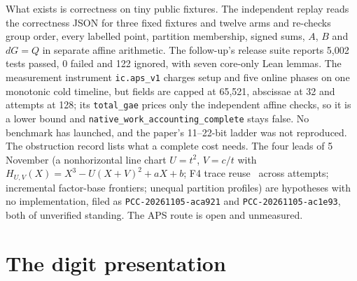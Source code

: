 What exists is correctness on tiny public fixtures. The independent replay
reads the correctness JSON for three fixed fixtures and twelve arms and
re-checks group order, every labelled point, partition membership, signed
sums, $A$, $B$ and $dG=Q$ in separate affine arithmetic. The follow-up's
release suite reports 5{,}002 tests passed, 0 failed and 122 ignored, with
seven core-only Lean lemmas. The measurement instrument \texttt{ic.aps\_v1}
charges setup and five online phases on one monotonic cold timeline, but
fields are capped at 65{,}521, abscissae at 32 and attempts at 128; its
\texttt{total\_gae} prices only the independent affine checks, so it is a
lower bound and \texttt{native\_work\_accounting\_complete} stays false. No
benchmark has launched, and the paper's 11--22-bit ladder was not
reproduced. The obstruction record
 lists what a complete
cost needs. The four leads of 5 November (a nonhorizontal line chart
$U=t^2$, $V=c/t$ with $H_{U,V}(X)=X^3-U(X+V)^2+aX+b$; F4 trace reuse~\cite{jouxvitse2011f4} across
attempts; incremental factor-base frontiers; unequal partition profiles)
are hypotheses with no implementation, filed as \texttt{PCC-20261105-aca921}
and \texttt{PCC-20261105-ac1e93}, both of unverified standing. The APS
route is open and unmeasured.

\section{The digit presentation}\label{sec:pa-digit}

